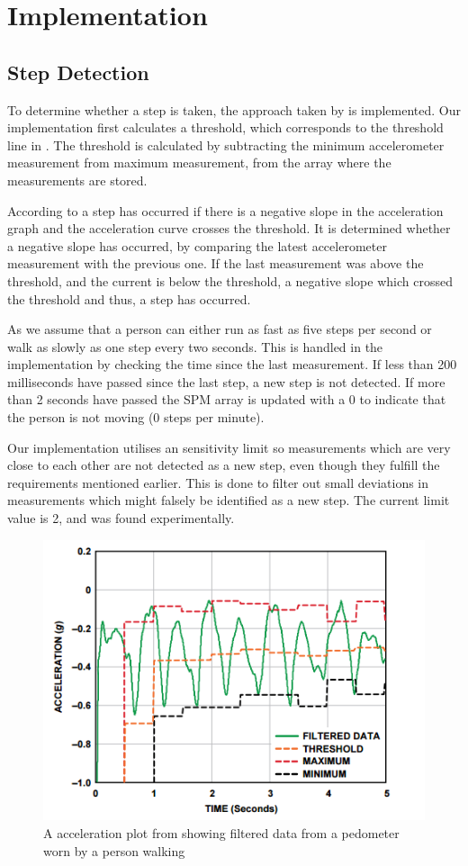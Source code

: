 \section{Implementation}
\subsection{Step Detection}\label{sec:stepCnt}
To determine whether a step is taken, the approach taken by \citet{zhao:pedometer} is implemented. Our implementation first calculates a threshold, which corresponds to the threshold line in . The threshold is calculated by subtracting the minimum accelerometer measurement from maximum measurement, from the array where the measurements are stored.

According to \citet[p. 2]{zhao:pedometer} a step has occurred if there is a negative slope in the acceleration graph and the acceleration curve crosses the threshold. It is determined whether a negative slope has occurred, by comparing the latest accelerometer measurement with the previous one. If the last measurement was above the threshold, and the current is below the threshold, a negative slope which crossed the threshold and thus, a step has occurred.

As \citet[p. 2]{zhao:pedometer} we assume that a person can either run as fast as five steps per second or walk as slowly as one step every two seconds. This is handled in the implementation by checking the time since the last measurement. If less than 200 milliseconds have passed since the last step, a new step is not detected. If more than 2 seconds have passed the SPM array is updated with a 0 to indicate that the person is not moving (0 steps per minute).

Our implementation utilises an sensitivity limit so measurements which are very close to each other are not detected as a new step, even though they fulfill the requirements mentioned earlier. This is done to filter out small deviations in measurements which might falsely be identified as a new step. The current limit value is 2, and was found experimentally.
\begin{figure}[h!]
  \centering
    \includegraphics[scale=0.8]{Images/accPlot.png}
  \caption{A acceleration plot from \citet[p. 2]{zhao:pedometer} showing filtered data from a pedometer worn by a person walking}
  \label{fig:zhaoGraph}
\end{figure}
